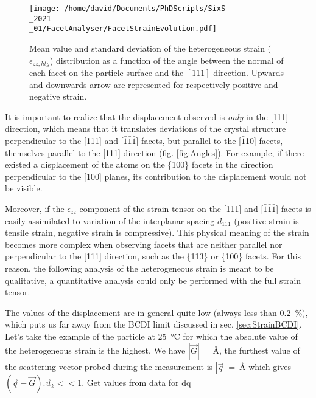 \begin{figure}[!htb]
    \centering
    \texttt{[image: /home/david/Documents/PhDScripts/SixS\\\_2021\\\_01/FacetAnalyser/FacetStrainEvolution.pdf]}
    \caption{
        Mean value and standard deviation of the heterogeneous strain ($\epsilon_{zz, htg}$) distribution as a function of the angle between the normal of each facet on the particle surface and the $[111]$ direction.
        Upwards and downwards arrow are represented for respectively positive and negative strain.
    }
    \label{fig:AmaterasuStrain}
\end{figure}

It is important to realize that the displacement observed is \textit{only} in the [111] direction, which means that it translates deviations of the crystal structure perpendicular to the [111] and [$\bar{1}\bar{1}\bar{1}$] facets, but parallel to the [$\bar{1}$10] facets, themselves parallel to the [111] direction (fig. \ref{fig:Angles}).
For example, if there existed a displacement of the atoms on the \{100\} facets in the direction perpendicular to the [100] planes, its contribution to the displacement would not be visible.

Moreover, if the $\epsilon_{zz}$ component of the strain tensor on the [111] and [$\bar{1}\bar{1}\bar{1}$] facets is easily assimilated to variation of the interplanar spacing $d_{111}$ (positive strain is tensile strain, negative strain is compressive).
This physical meaning of the strain becomes more complex when observing facets that are neither parallel nor perpendicular to the [111] direction, such as the \{113\} or \{100\} facets.
For this reason, the following analysis of the heterogeneous strain is meant to be qualitative, a quantitative analysis could only be performed with the full strain tensor.

The values of the displacement are in general quite low (always less than \qty{0.2}{\percent}), which puts us far away from the BCDI limit discussed in sec. \ref{sec:StrainBCDI}.
Let's take the example of the particle at \qty{25}{\degreeCelsius} for which the absolute value of the heterogeneous strain is the highest.
We have $|\vec{G}| = \qty{}{\angstrom}$, the furthest value of the scattering vector probed during the measurement is $|\vec{q}| = \qty{}{\angstrom}$ which gives $(\vec{q}-\vec{G}).\vec{u}_k<<1$.
\textcolor{Important}{Get values from data for dq}

